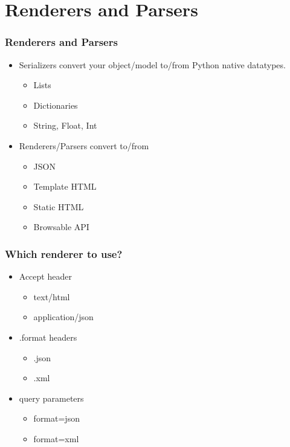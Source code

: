 \documentclass{beamer}
\begin{document}
\section{Renderers and Parsers}
\begin{frame}[fragile]

  \frametitle{Renderers and Parsers}

  \begin{itemize}
  \item Serializers convert your object/model to/from Python native datatypes.
  	\begin{itemize}
		\item Lists
		\item Dictionaries
        		\item String, Float, Int
	\end{itemize}
  \item Renderers/Parsers convert to/from
  	\begin{itemize}
            	\item JSON
            	\item Template HTML
            	\item Static HTML
            	\item Browsable API
	\end{itemize}
  \end{itemize}
  
\end{frame}

\begin{frame}[fragile]

  \frametitle{Which renderer to use?}

  \begin{itemize}
  	\item Accept header 
            \begin{itemize}
            \item text/html
            \item application/json
            \end{itemize}
  	\item .format headers 
            \begin{itemize}
            \item .json
            \item .xml
            \end{itemize}
  	\item query parameters
            \begin{itemize}
            \item format=json
            \item format=xml
            \end{itemize}
  \end{itemize}
  
\end{frame}
\end{document}
